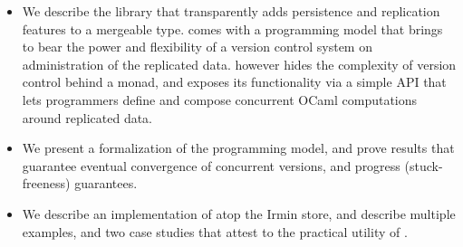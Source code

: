 \begin{itemize}
\begin{itemize}
    \item We describe the \name library that transparently adds
    persistence and replication features to a mergeable type. \name
    comes with a programming model that brings to bear the power and
    flexibility of a version control system on administration of the
    replicated data. \name however hides the complexity of version
    control behind a monad, and exposes its functionality via a simple
    API that lets programmers define and compose concurrent OCaml
    computations around replicated data. 

    \item We present a formalization of the \name programming model,
    and prove results that guarantee eventual convergence of
    concurrent versions, and progress (stuck-freeness) guarantees.

    \item We describe an implementation of \name atop the Irmin store,
    and describe multiple examples, and two case studies that
    attest to the practical utility of \name.
  \end{itemize}

\end{itemize}
